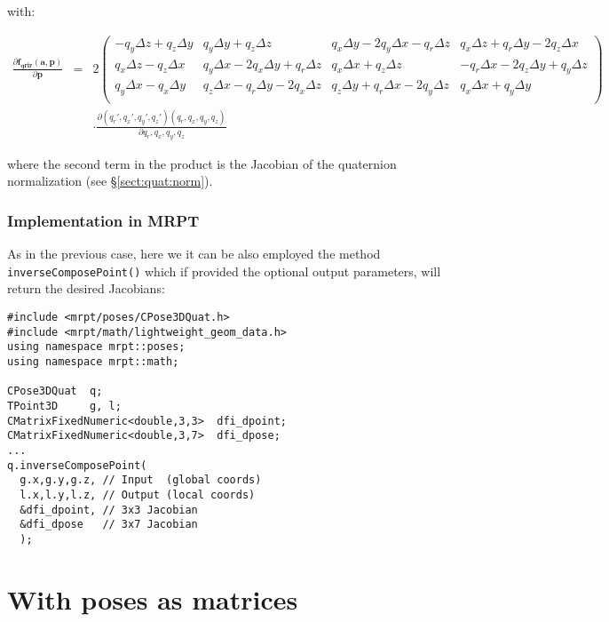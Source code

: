 \documentclass[a4paper,11pt]{report}
\begin{document}
\noindent with:

\begin{eqnarray}
\label{eq:jacob.f_qrir_p}
\frac{ \partial \mathbf{f_{qrir}}( \mathbf{a}, \mathbf{p} )}{\partial \mathbf{p}}
&=&
2
\left(\begin{array}{cccc}
-q_y \Delta z + q_z \Delta y &                  q_y \Delta y + q_z \Delta z &
q_x \Delta y - 2 q_y \Delta x - q_r \Delta z &  q_x \Delta z + q_r \Delta y - 2q_z \Delta x
\\
q_x \Delta z - q_z \Delta x &  q_y \Delta x - 2 q_x \Delta y + q_r \Delta z &
q_x \Delta x + q_z \Delta z &  -q_r \Delta x - 2 q_z \Delta y + q_y \Delta z
\\
q_y \Delta x - q_x \Delta y &  q_z \Delta x - q_r \Delta y - 2 q_x \Delta z &
q_z \Delta y + q_r \Delta x - 2 q_y \Delta z &  q_x \Delta x + q_y \Delta y
\\
\end{array}\right) \nonumber \\
& ~ & \cdot \frac{\partial (q_r',q_x',q_y',q_z')(q_r,q_x,q_y,q_z)}{\partial q_r,q_x,q_y,q_z}
\end{eqnarray}

\noindent where the second term in the product is the Jacobian of the quaternion
normalization (see \S \ref{sect:quat:norm}).



\subsubsection{Implementation in MRPT}

As in the previous case, here we it can be also employed the method
\texttt{inverseComposePoint()} which if provided the optional output parameters,
will return the desired Jacobians:

\begin{lstlisting}
#include <mrpt/poses/CPose3DQuat.h>
#include <mrpt/math/lightweight_geom_data.h>
using namespace mrpt::poses;
using namespace mrpt::math;

CPose3DQuat  q;
TPoint3D     g, l;
CMatrixFixedNumeric<double,3,3>  dfi_dpoint;
CMatrixFixedNumeric<double,3,7>  dfi_dpose;
...
q.inverseComposePoint(
  g.x,g.y,g.z, // Input  (global coords)
  l.x,l.y,l.z, // Output (local coords)
  &dfi_dpoint, // 3x3 Jacobian
  &dfi_dpose   // 3x7 Jacobian
  );
\end{lstlisting}



\section{With poses as matrices}
\label{sect:inv_comp_mat}
\end{document}
